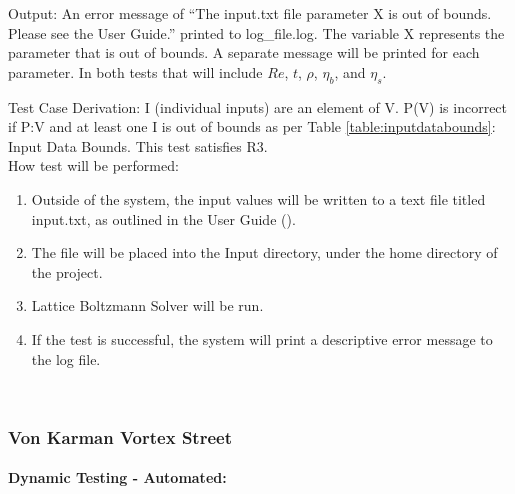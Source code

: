 \documentclass[12pt, titlepage]{article}
\newcommand{\famname}{Lattice Boltzmann Solver}
\begin{document}
\begin{enumerate}
Output: An error message of ``The input.txt file parameter X is out of bounds. Please see the User Guide.'' printed to log\_file.log. The variable X represents the parameter that is out of bounds. A separate message will be printed for each parameter. In both tests that will include $Re$, $t$, $\rho$, $\eta_b$, and $\eta_s$.

Test Case Derivation: 
I (individual inputs) are an element of V. P(V) is incorrect if P:V and at least
one I is out of bounds as per Table \ref{table:inputdatabounds}: Input Data
Bounds. This test satisfies R3.\\
					
How test will be performed: 

\begin{enumerate}
\item Outside of the system, the input values will be written to a text file titled input.txt, as outlined in the User Guide
  (\citet{LBM_UserGuide_PM}).
\item The file will be placed into the Input directory, under the home directory
  of the project.
\item {\famname} will be run.
\item If the test is successful, the system will print a descriptive error message to the log file.\\

\end{enumerate}

\end{enumerate}


~\newpage

\subsubsection{Von Karman Vortex Street}
\label{frvkvs}
		
\paragraph{Dynamic Testing - Automated:}
\end{document}
